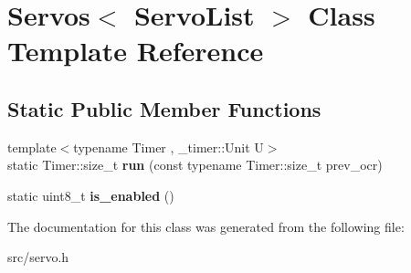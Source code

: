 \hypertarget{classServos}{}\section{Servos$<$ Servo\+List $>$ Class Template Reference}
\label{classServos}
\subsection*{Static Public Member Functions}
\begin{DoxyCompactItemize}
\item 
\hypertarget{classServos_a33b5784c1ea60c6df367f00e610bdaaf}{}\label{classServos_a33b5784c1ea60c6df367f00e610bdaaf} 
{\footnotesize template$<$typename Timer , \+\_\+timer\+::\+Unit U$>$ }\\static Timer\+::size\+\_\+t {\bfseries run} (const typename Timer\+::size\+\_\+t prev\+\_\+ocr)
\item 
\hypertarget{classServos_acd095cd7221ae58e3165f47ce7f8620d}{}\label{classServos_acd095cd7221ae58e3165f47ce7f8620d} 
static uint8\+\_\+t {\bfseries is\+\_\+enabled} ()
\end{DoxyCompactItemize}


The documentation for this class was generated from the following file\+:\begin{DoxyCompactItemize}
\item 
src/servo.\+h\end{DoxyCompactItemize}
